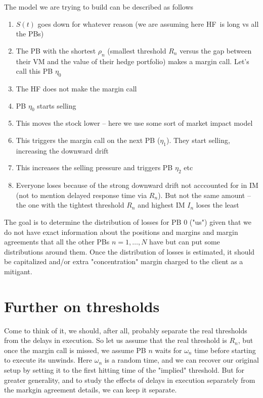 \documentclass{article}
\begin{document}
The model we are trying to build can be described as follows

\begin{enumerate}
\item $S(t)$ goes down for whatever reason (we are assuming here HF\ is long
vs all the PBs)

\item The PB with the shortest $\rho _{n}$ (smallest threshold $R_{n}$
versus the gap between their VM and the value of their hedge portfolio)
makes a margin call. Let's call this PB $\eta _{0}$

\item The HF does not make the margin call

\item PB $\eta _{0}$ starts selling

\item This moves the stock lower -- here we use some sort of market impact
model

\item This triggers the margin call on the next PB ($\eta _{1}$). They start
selling, increasing the downward drift

\item This increases the selling pressure and triggers PB $\eta _{2}$ etc

\item Everyone loses because of the strong downward drift not acccounted for
in IM (not to mention delayed response time via $R_{n}$). But not the same
amount -- the one with the tightest threshold $R_{n}$ and highest IM $I_{n}$
loses the least
\end{enumerate}

The goal is to determine the distribution of losses for PB $0$ ("us") given
that we do not have exact information about the positions and margins and
margin agreements that all the other PBs $n=1,\dots ,N$ have but can put
some distributions around them. Once the distribution of losses is
estimated, it should be capitalized and/or extra "concentration" margin
charged to the client as a mitigant.

\section{Further on thresholds}

Come to think of it, we should, after all, probably separate the real
thresholds from the delays in execution. So let us assume that the real
threshold is $R_{n}$, but once the margin call is missed, we assume PB $n$
waits for $\omega _{n}$ time before starting to execute its unwinds. Here $%
\omega _{n}$ is a random time, and we can recover our original setup by
setting it to the first hitting time of the "implied" threshold. But for
greater generality, and to study the effects of delays in execution
separately from the markgin agreement details, we can keep it separate.
\end{document}
